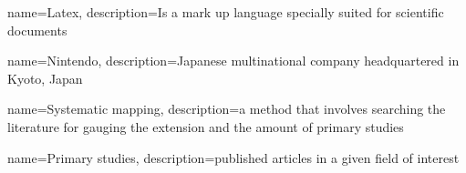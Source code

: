 

{
    name=Latex,
    description={Is a mark up language specially suited 
    for scientific documents}
}

{
    name=Nintendo,
    description={Japanese multinational company headquartered in Kyoto, Japan}
}

{
    name=Systematic mapping,
    description={a method that involves searching the literature for gauging the extension and the amount of primary studies}
}

{
    name=Primary studies,
    description={published articles in a given field of interest}
}
